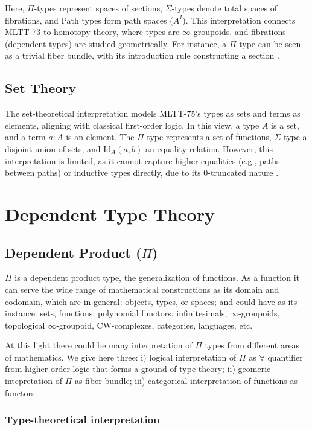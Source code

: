 \documentclass{article}
\begin{document}
Here, $\Pi$-types represent spaces of sections, $\Sigma$-types denote
total spaces of fibrations, and Path types form path spaces ($A^I$).
This interpretation connects MLTT-73 to homotopy theory, where types
are $\infty$-groupoids, and fibrations (dependent types) are studied
geometrically. For instance, a $\Pi$-type can be seen as a trivial fiber
bundle, with its introduction rule constructing a section \cite{HoTT13}.

\subsection*{Set Theory}

The set-theoretical interpretation models MLTT-75’s types as sets and
terms as elements, aligning with classical first-order logic. In this
view, a type $A$ is a set, and a term $a : A$ is an element. The $\Pi$-type
represents a set of functions, $\Sigma$-type a disjoint union of sets,
and $\text{Id}_A(a, b)$ an equality relation. However, this interpretation
is limited, as it cannot capture higher equalities (e.g., paths between paths)
or inductive types directly, due to its 0-truncated nature \cite{HoTT13}.

\section{Dependent Type Theory}

\subsection{Dependent Product ($\Pi$)}

$\Pi$ is a dependent product type, the generalization of functions.
As a function it can serve the wide range of mathematical constructions as its domain and codomain,
which are in general: objects, types, or spaces; and could have as its
instance: sets, functions, polynomial functors, infinitesimals, $\infty$-groupoids,
topological $\infty$-groupoid, CW-complexes,
categories, languages, etc.

At this light there could be many interpretation of $\Pi$ types from different
areas of mathematics. We give here three:
i) logical interpretation of $\Pi$ as $\forall$ quantifier from higher order logic that forms a ground of type theory;
ii) geomeric intepretation of $\Pi$ as fiber bundle;
iii) categorical interpretation of functions as functors.

\subsubsection*{Type-theoretical interpretation}
\end{document}
